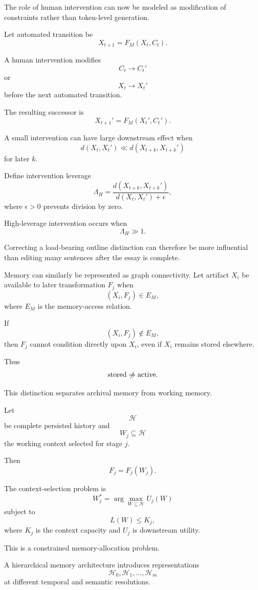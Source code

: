 \documentclass[11pt]{article}
\begin{document}
The role of human intervention can now be modeled as modification of constraints rather than token-level generation.

Let automated transition be
\[
    X_{t+1}
    =
    F_M(X_t,C_t).
\]

A human intervention modifies
\[
    C_t\rightarrow C_t'
\]
or
\[
    X_t\rightarrow X_t'
\]
before the next automated transition.

The resulting successor is
\[
    X_{t+1}'
    =
    F_M(X_t',C_t').
\]

A small intervention can have large downstream effect when
\[
    d(X_t,X_t')
\ll
d(X_{t+k},X_{t+k}')
\]
for later \(k\).

Define intervention leverage
\[
    \Lambda_H
    =
    \frac{
        d(X_{t+k},X_{t+k}')
    }{
        d(X_t,X_t')+\epsilon
    },
\]
where \(\epsilon>0\) prevents division by zero.

High-leverage intervention occurs when
\[
    \Lambda_H\gg1.
\]

Correcting a load-bearing outline distinction can therefore be more influential than editing many sentences after the essay is complete.

Memory can similarly be represented as graph connectivity. Let artifact \(X_i\) be available to later transformation \(F_j\) when
\[
    (X_i,F_j)\in E_M,
\]
where \(E_M\) is the memory-access relation.

If
\[
    (X_i,F_j)\notin E_M,
\]
then \(F_j\) cannot condition directly upon \(X_i\), even if \(X_i\) remains stored elsewhere.

Thus
\[
    \text{stored}
    \centernot\Rightarrow
    \text{active}.
\]

This distinction separates archival memory from working memory.

Let
\[
    \mathcal{H}
\]
be complete persisted history and
\[
    W_j\subseteq\mathcal{H}
\]
the working context selected for stage \(j\).

Then
\[
    F_j
    =
    F_j(W_j).
\]

The context-selection problem is
\[
    W_j^\ast
    =
    \arg\max_{W\subseteq\mathcal{H}}
    U_j(W)
\]
subject to
\[
    L(W)\leq K_j,
\]
where \(K_j\) is the context capacity and \(U_j\) is downstream utility.

This is a constrained memory-allocation problem.

A hierarchical memory architecture introduces representations
\[
    \mathcal{H}_0,
    \mathcal{H}_1,
    \ldots,
    \mathcal{H}_m
\]
at different temporal and semantic resolutions.
\end{document}
